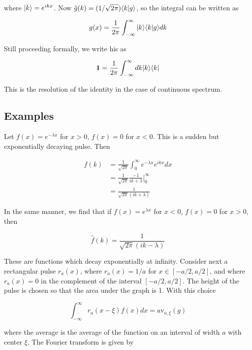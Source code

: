where $| k \rangle = e^{ikx}$. Now $\hat g(k) = (1/\sqrt{2\pi} )\langle k | g \rangle$, so the integral can be written as

\begin{equation}
g(x)  = \frac{1}{2\pi} \int_{-\infty}^\infty  | k \rangle \langle k | g \rangle dk
\end{equation}

Still proceeding formally, we write his as

\begin{equation}
{\bf 1} = \frac{1}{2\pi} \int_{-\infty}^\infty dk | k \rangle \langle k |  
\end{equation}

This is the resolution of the identity in the case of continuous spectrum.




\subsection{Examples}

Let $f(x) = e^{-\lambda x}$ for $x > 0$, $f(x) = 0$ for $x < 0$.  This is a sudden but exponentially decaying pulse. Then

\begin{align}
\hat f(k) &= \frac{1}{\sqrt{2\pi}}\int_0^\infty e^{-\lambda x} e^{ikx} dx \\
&= \frac{1}{\sqrt{2\pi}} \frac{-1}{ik + \lambda}\Big\vert_0^\infty \\
 &= \frac{1}{\sqrt{2\pi}(ik + \lambda)}
\end{align}

In the same manner, we find that if $f(x) = e^{\lambda x}$ for $x < 0$, $f(x) = 0$ for $x > 0$, then

\begin{equation}
\hat f(k) =  \frac{1}{\sqrt{2\pi}(ik - \lambda)}
\end{equation}


These are functions which decay exponentially at infinity.  Consider next a rectangular pulse $r_a(x)$, where $r_a(x) = 1/a$ for $x \in [-a/2,a/2]$,  and where $r_a(x) = 0$ in the complement of the interval $[-a/2,a/2]$.  The height of the pulse is chosen so that the area under the graph is 1.  With this choice

\begin{equation}
  \int_{-\infty}^\infty r_a(x-\xi)f(x) dx = \text{av}_{a, \xi}(g)
\end{equation}

where the average is the average of the function on an interval of width $a$ with center $\xi$.  The Fourier transform is given by 

